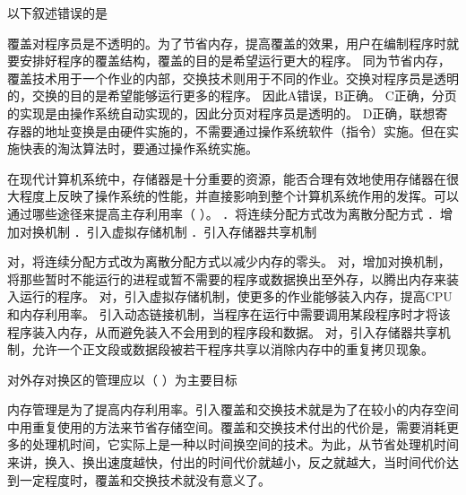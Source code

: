 \question 以下叙述错误的是
\par{}
\begin{solution}覆盖对程序员是不透明的。为了节省内存，提高覆盖的效果，用户在编制程序时就要安排好程序的覆盖结构，覆盖的目的是希望运行更大的程序。
同为节省内存，覆盖技术用于一个作业的内部，交换技术则用于不同的作业。交换对程序员是透明的，交换的目的是希望能够运行更多的程序。
因此A错误，B正确。
C正确，分页的实现是由操作系统自动实现的，因此分页对程序员是透明的。
D正确，联想寄存器的地址变换是由硬件实施的，不需要通过操作系统软件（指令）实施。但在实施快表的淘汰算法时，要通过操作系统实施。
\end{solution}
\question 在现代计算机系统中，存储器是十分重要的资源，能否合理有效地使用存储器在很大程度上反映了操作系统的性能，并直接影响到整个计算机系统作用的发挥。可以通过哪些途径来提高主存利用率（
）。 ．将连续分配方式改为离散分配方式 ．增加对换机制
．引入虚拟存储机制 ．引入存储器共享机制
\par{}
\begin{solution}对，将连续分配方式改为离散分配方式以减少内存的零头。
对，增加对换机制，将那些暂时不能运行的进程或暂不需要的程序或数据换出至外存，以腾出内存来装入运行的程序。
对，引入虚拟存储机制，使更多的作业能够装入内存，提高CPU和内存利用率。
引入动态链接机制，当程序在运行中需要调用某段程序时才将该程序装入内存，从而避免装入不会用到的程序段和数据。
对，引入存储器共享机制，允许一个正文段或数据段被若干程序共享以消除内存中的重复拷贝现象。
\end{solution}
\question 对外存对换区的管理应以（ ）为主要目标
\par{}
\begin{solution}内存管理是为了提高内存利用率。引入覆盖和交换技术就是为了在较小的内存空间中用重复使用的方法来节省存储空间。覆盖和交换技术付出的代价是，需要消耗更多的处理机时间，它实际上是一种以时间换空间的技术。为此，从节省处理机时间来讲，换入、换出速度越快，付出的时间代价就越小，反之就越大，当时间代价达到一定程度时，覆盖和交换技术就没有意义了。
\end{solution}

